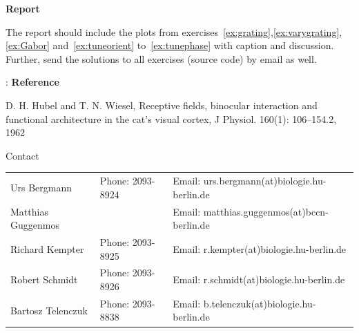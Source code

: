 \documentclass[12pt, a4]{article}
\begin{document}
\vspace{1cm}

{\bf Report}

The report should include the plots from
exercises~\ref{ex:grating},\ref{ex:varygrating},\ref{ex:Gabor}
and~\ref{ex:tuneorient} to~\ref{ex:tunephase} with caption and discussion.
Further, send the solutions to all exercises (source code) by email as well.

\vspace{1cm}:
{\bf Reference}

D. H. Hubel and T. N. Wiesel, Receptive fields, binocular interaction
and functional architecture in the cat's visual cortex, J Physiol.
160(1): 106–154.2, 1962

\vfill
\centerline{\CAP Contact}
\CAP

\begin{tabular}{lll}
Urs Bergmann & Phone: 2093-8924 & Email:
urs.bergmann(at)biologie.hu-berlin.de \\
Matthias Guggenmos & & Email: matthias.guggenmos(at)bccn-berlin.de \\
Richard Kempter \hfill & Phone: 2093-8925 \hfill & Email:
r.kempter(at)biologie.hu-berlin.de \\
Robert Schmidt & Phone: 2093-8926 & Email: r.schmidt(at)biologie.hu-berlin.de
\\
Bartosz Telenczuk & Phone: 2093-8838 & Email:
b.telenczuk(at)biologie.hu-berlin.de \\
\end{tabular}
\end{document}
